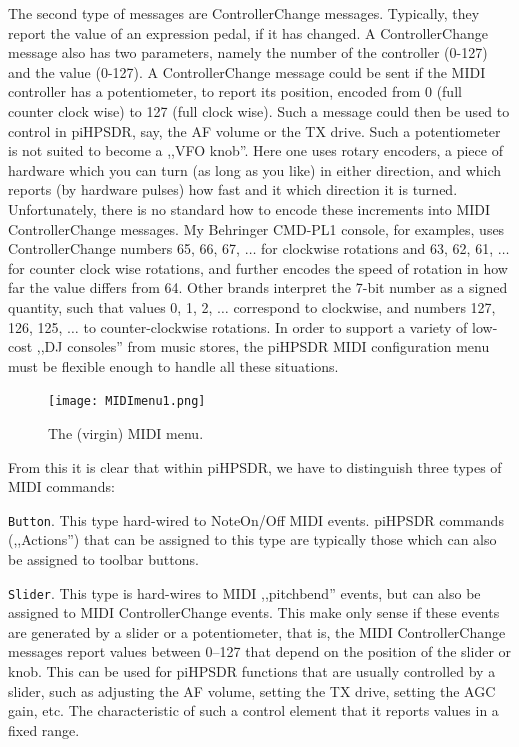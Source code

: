\documentclass[12pt]{book}
\def\rett#1{\texttt{\color{red}#1}}
\def\pH{pi\-HPSDR\xspace}
\begin{document}
The second type of messages are ControllerChange messages. Typically, they report the value of
an expression pedal, if it has changed. A ControllerChange message also has two parameters,
namely the number of the controller (0-127) and the value (0-127). A ControllerChange
message could be sent if the MIDI controller has a potentiometer, to report its position,
encoded from 0 (full counter clock wise) to 127 (full clock wise). Such a message could then be
used to control in \pH, say, the AF volume or the TX drive. Such a potentiometer is
not suited to become a ,,VFO knob''. Here one uses rotary encoders, a piece of hardware which
you can turn (as long as you like) in either direction, and which reports (by hardware pulses)
how fast and it which direction it is turned. Unfortunately, there is no standard how to
encode these increments into MIDI ControllerChange messages. My Behringer CMD-PL1 console,
for examples, uses ControllerChange numbers 65, 66, 67, $\ldots$ for clockwise rotations
and 63, 62, 61, $\ldots$ for counter clock wise rotations, and further encodes the speed of
rotation in how far the value differs from 64. Other brands interpret the 7-bit number
as a signed quantity, such that values 0, 1, 2, $\ldots$ correspond to clockwise,
and numbers 127, 126, 125, $\ldots$ to counter-clockwise rotations. In order to
support a variety of low-cost ,,DJ consoles'' from music stores,
the \pH MIDI configuration menu must be flexible enough to handle all these situations.

\begin{figure}[ht]
\center
\texttt{[image: MIDImenu1.png]}
\caption{The (virgin) MIDI menu.}
\label{fig:MIDImenu1}
\end{figure}

From this it is clear that within \pH, we have to distinguish three types
of MIDI commands:

\rett{Button}. This type hard-wired to NoteOn/Off MIDI events. \pH commands (,,Actions'') that
can be assigned to this type are typically those which can also be assigned to toolbar
buttons.

\rett{Slider}. This type is hard-wires to MIDI ,,pitchbend'' events, but can also be assigned
to MIDI ControllerChange events. This make only sense if these events are generated
by a slider or a potentiometer, that is, the MIDI ControllerChange messages report
values between 0--127 that depend on the position of the slider or knob.
This can be used
for \pH functions that are usually controlled by a slider, such as adjusting the AF
volume, setting the TX drive, setting the AGC gain, etc. The characteristic of such
a control element that it reports values in a fixed range.
\end{document}
